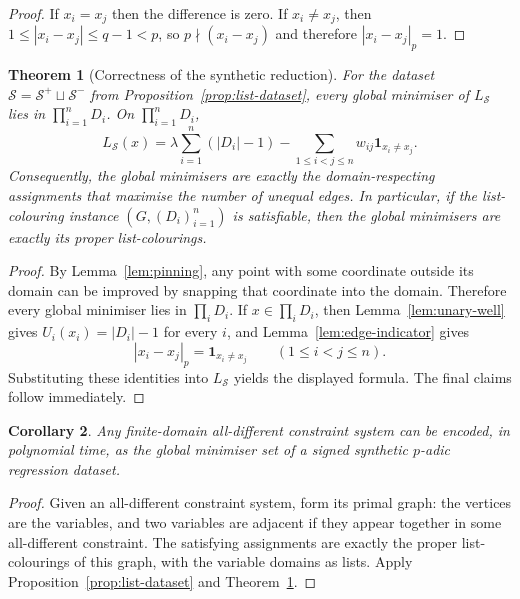 \documentclass[11pt]{article}
\newtheorem{theorem}{Theorem}
\newtheorem{corollary}[theorem]{Corollary}
\begin{document}
\begin{proof}
If \(x_i=x_j\) then the difference is zero. If \(x_i\neq x_j\), then \(1\le |x_i-x_j|\le q-1<p\), so \(p\nmid (x_i-x_j)\) and therefore \(|x_i-x_j|_p=1\).
\end{proof}

\begin{theorem}[Correctness of the synthetic reduction]
\label{thm:all-different}
For the dataset \(\mathcal S=\mathcal S^+\sqcup\mathcal S^-\) from Proposition~\ref{prop:list-dataset}, every global minimiser of \(L_{\mathcal S}\) lies in \(\prod_{i=1}^n D_i\). On \(\prod_{i=1}^n D_i\),
\[
L_{\mathcal S}(x)
=
\lambda\sum_{i=1}^n (|D_i|-1)
-\sum_{1\le i<j\le n} w_{ij}\mathbf 1_{x_i\neq x_j}.
\]
Consequently, the global minimisers are exactly the domain-respecting assignments that maximise the number of unequal edges. In particular, if the list-colouring instance \((G,(D_i)_{i=1}^n)\) is satisfiable, then the global minimisers are exactly its proper list-colourings.
\end{theorem}

\begin{proof}
By Lemma~\ref{lem:pinning}, any point with some coordinate outside its domain can be improved by snapping that coordinate into the domain. Therefore every global minimiser lies in \(\prod_i D_i\). If \(x\in \prod_i D_i\), then Lemma~\ref{lem:unary-well} gives \(U_i(x_i)=|D_i|-1\) for every \(i\), and Lemma~\ref{lem:edge-indicator} gives
\[
|x_i-x_j|_p=\mathbf 1_{x_i\neq x_j}
\qquad (1\le i<j\le n).
\]
Substituting these identities into \(L_{\mathcal S}\) yields the displayed formula. The final claims follow immediately.
\end{proof}

\begin{corollary}
\label{cor:all-different-csp}
Any finite-domain all-different constraint system can be encoded, in polynomial time, as the global minimiser set of a signed synthetic $p$-adic regression dataset.
\end{corollary}

\begin{proof}
Given an all-different constraint system, form its primal graph: the vertices are the variables, and two variables are adjacent if they appear together in some all-different constraint. The satisfying assignments are exactly the proper list-colourings of this graph, with the variable domains as lists. Apply Proposition~\ref{prop:list-dataset} and Theorem~\ref{thm:all-different}.
\end{proof}
\end{document}
